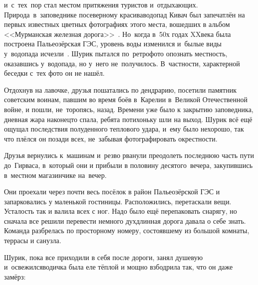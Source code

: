 
\noindent и~с~тех~пор стал местом притяжения туристов и~отдыхающих.
Природа~в~заповеднике по\sdash северному красива\mdash водопад Кивач был запечатлён на первых известных цветных фотографиях этого места, вошедших в альбом <<Мурманская железная дорога>>~\cite{ПрокудинГорский}. Но~когда в~50\sdash х годах XX\hspace{0.25em}века была построена Пальеозёрская ГЭС, уровень воды изменился и~былые виды у~водопада исчезли~\cite{ПервунинаКивач}. Шурик пытался по~ретрофото опознать местность, оказавшись у~водопада, но у~него не~получилось. В~частности, характерной беседки с~тех фото он не нашёл.

Отдохнув на лавочке, друзья пошатались по дендрарию, посетили памятник советским воинам, павшим во время боёв в~Карелии в~Великой Отечественной войне, и пошли, не~торопясь, назад. Времени уже было к закрытию заповедника, дневная жара наконец\sdash то спала, ребята потихоньку шли на выход. Шурик всё ещё ощущал последствия полуденного теплового удара, и~ему было нехорошо, так что плёлся он позади всех, не~забывая фотографировать окрестности. 

Друзья вернулись к~машинам и~резво рванули преодолеть последнюю часть пути до~Гирваса, в~который они и прибыли в половину десятого~вечера, закупившись в~местном магазинчике на~вечер.

Они проехали через почти весь посёлок в район Пальеозёрской ГЭС и запарковались у маленькой гостиницы. Расположились, перетаскали вещи. Усталость так и валила всех с ног. Надо было ещё перепаковать снарягу, но сначала все решили перевести немного дух\mdash длинная дорога давала о себе знать. Команда разбрелась по просторному номеру, состоявшему из большой комнаты, террасы и санузла. 

Шурик, пока все приходили в себя после дороги, занял душевую и~освежился\mdash водичка была еле тёплой и мощно взбодрила так, что он даже замёрз:

